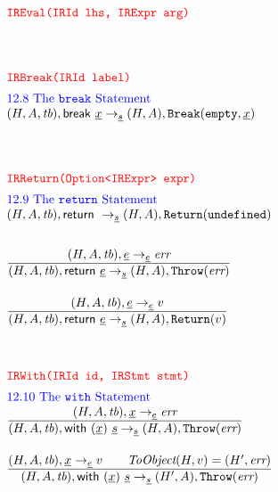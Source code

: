 \[
\begin{array}{l@{~~}l@{~~}ll}
\mtt{\normalsize\inred IREval(IRId lhs, IRExpr arg)}\\[4em]


\mtt{\normalsize\inred IRBreak(IRId label)}\\[.5em]
\mbox{\inblue 12.8 The {\tt break} Statement}\\
\state, \irbreak \rightarrow_{\ir\stmt} \res, {\tt Break}({\tt empty}, \ir{x})
\\[4em]


\mtt{\normalsize\inred IRReturn(Option<IRExpr> expr)}\\[.5em]
\mbox{\inblue 12.9 The {\tt return} Statement}\\
\state,{\sf return}\  \rightarrow_{\ir{\stmt}} \res,{\tt Return}(\tt{undefined})
\\[2em]

\frac{\begin{matrix}
\evale, \irexpr \rightarrow_{\ir\expr} \err
\end{matrix}}
{\begin{matrix}
\state,{\sf return}\ \irexpr  \rightarrow_{\ir{\stmt}} \res,{\tt Throw}(\err)
\end{matrix}}
\\[2em]

\frac{\begin{matrix}
\evale, \irexpr \rightarrow_{\ir\expr} v
\end{matrix}}
{\begin{matrix}
\state,{\sf return}\ \irexpr  \rightarrow_{\ir{\stmt}} \res,{\tt Return}(v)
\end{matrix}}
\\[4em]

\mtt{\normalsize\inred IRWith(IRId id, IRStmt stmt)}\\[.5em]
\mbox{\inblue 12.10 The {\tt with} Statement}\\
\frac{\begin{matrix}
\evale, \irid \rightarrow_{\ir\expr} \err
\end{matrix}}{\begin{matrix}
\state, \irwith \rightarrow_{\ir\stmt} \res, {\tt Throw}(\err)
\end{matrix}}
\\[2em]

\frac{\begin{matrix}
\evale, \irid \rightarrow_{\ir\expr} v
\rulesep
\hf{ToObject}(H, v) = (H', \err)
\end{matrix}}{\begin{matrix}
\state, \irwith \rightarrow_{\ir\stmt} (H',A), {\tt Throw}(\err)
\end{matrix}}
\\[2em]


\end{array}\]
